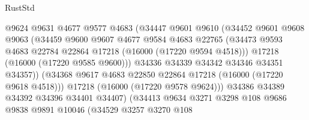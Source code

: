 \begin{lexlean}{RustStd}
\begin{coremodule}
                                @9624
                                @9631
                                @4677
                                @9577
                                @4683
                                (@34447
                                  @9601
                                  @9610
                                  (@34452
                                    @9601
                                    @9608
                                    @9063
                                    (@34459
                                      @9600
                                      @9607
                                      @4677
                                      @9584
                                      @4683
                                      @22765
                                      (@34473
                                        @9593
                                        @4683
                                        @22784
                                        @22864
                                        @17218
                                        (@16000 (@17220 @9594 @4518)))
                                      @17218
                                      (@16000 (@17220 @9585 @9600)))
                                    @34336
                                    @34339
                                    @34342
                                    @34346
                                    @34351
                                    @34357))
                                (@34368
                                  @9617
                                  @4683
                                  @22850
                                  @22864
                                  @17218
                                  (@16000 (@17220 @9618 @4518)))
                                @17218
                                (@16000 (@17220 @9578 @9624)))
                              @34386
                              @34389
                              @34392
                              @34396
                              @34401
                              @34407)
                            (@34413
                              @9634
                              @3271
                              @3298
                              @108
                              @9686
                              @9838
                              @9891
                              @10046
                              (@34529
                                @3257
                                @3270
                                @108

\end{coremodule}
\end{lexlean}
